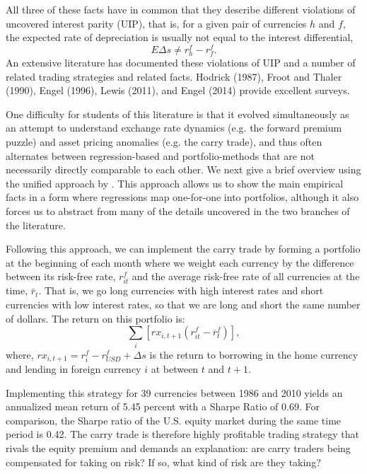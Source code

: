 \documentclass{ar-1col}
\begin{document}
All three of these facts have in common that they describe different violations of uncovered interest parity (UIP), that is, for a given pair of currencies $h$ and $f$, the expected rate of depreciation is usually not equal to the interest differential, $$E\Delta s \neq r^f_h-r^f_f .$$ An extensive literature has documented these violations of UIP and a number of related trading strategies and related facts. Hodrick (1987), Froot and Thaler (1990), Engel (1996), Lewis (2011), and Engel (2014) provide excellent surveys. 

One difficulty for students of this literature is that it evolved simultaneously as an attempt to understand exchange rate dynamics (e.g. the forward premium puzzle) and asset pricing anomalies (e.g. the carry trade), and thus often alternates between regression-based and portfolio-methods that are not necessarily directly comparable to each other. We next give a brief overview using the unified approach by \citet{HassanMano2015}. This approach allows us to show the main empirical facts in a form where regressions map one-for-one into portfolios, although it also forces us to abstract from many of the details uncovered in the two branches of the literature.

Following this approach, we can implement the carry trade by forming a portfolio at the beginning of each month where we weight each currency by the difference between its risk-free rate, $r^f_{it}$ 
and the average risk-free rate of all currencies at the time, $\bar{r}_t$. That is, we go long currencies with high interest rates and short currencies with low interest rates, so that we are long and short the same number of dollars. The return on this 
portfolio is:
\begin{equation}
  \label{eq_carry}
  \textstyle\sum_{i}\left[ rx_{i,t+1}\left( r^f_{it}-\overline{r}^f_{t}\right) \right] ,
\end{equation}%
where, $rx_{i,t+1}=r^f_i-r^f_{USD}+\Delta s$ is the return to 
borrowing in the home currency and lending in foreign currency $i$ at
between $t$ and $t+1$.

Implementing this strategy for 39 currencies between 
1986 and 2010 yields an annualized mean return of 5.45 percent with 
a Sharpe Ratio of 0.69. For comparison, the Sharpe ratio of the U.S. 
equity market during the same time period is 0.42. The carry 
trade is therefore highly profitable trading strategy that rivals the equity premium and demands an explanation: are carry 
traders being compensated for taking on risk? If so, what kind of 
risk are they taking?
\end{document}
